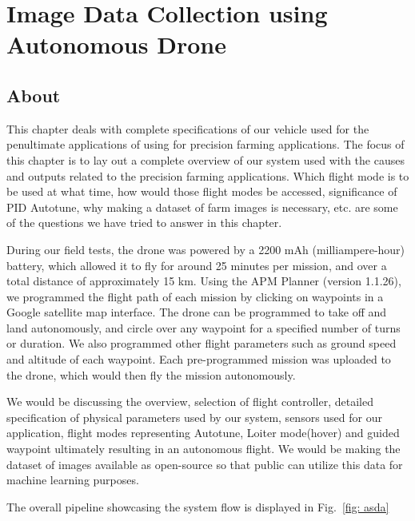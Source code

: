 \chapter{Image Data Collection using Autonomous Drone}

\section{About}

This chapter deals with complete specifications of our vehicle used for the penultimate applications of using for precision farming applications. The focus of this chapter is to lay out a complete overview of our system used with the causes and outputs related to the precision farming applications. Which flight mode is to be used at what time, how would those flight modes be accessed, significance of PID Autotune, why making a dataset of farm images is necessary, etc. are some of the questions we have tried to answer in this chapter. 

During our field tests, the drone was powered by a 2200 mAh (milliampere-hour) battery, which allowed it to fly for around 25 minutes per mission, and over a total distance of approximately 15 km. Using the APM Planner (version 1.1.26), we programmed the flight path of each mission by clicking on waypoints in a Google satellite map interface. The drone can be programmed to take off and land autonomously, and circle over any waypoint for a specified number of turns or duration. We also programmed other flight parameters such as ground speed and altitude of each waypoint. Each pre-programmed mission was uploaded to the drone, which would then fly the mission autonomously.


We would be discussing the overview, selection of flight controller, detailed specification of physical parameters used by our system, sensors used for our application, flight modes representing Autotune, Loiter mode(hover) and guided waypoint ultimately resulting in an autonomous flight. We would be making the dataset of images available as open-source so that public can utilize this data for machine learning purposes. 

The overall pipeline showcasing the system flow is displayed in Fig.~\ref{fig: asda}

